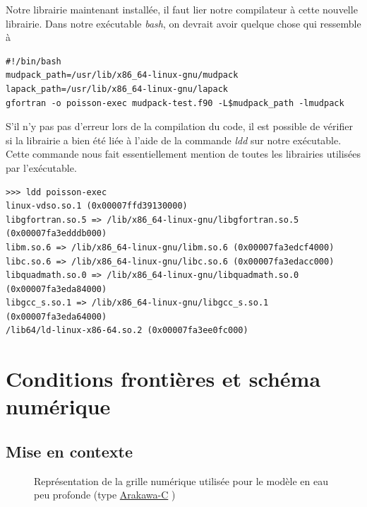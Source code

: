 \documentclass[10pt]{article}
\numberwithin{equation}{section}
\newcommand{\pt}{\hspace{1pt}}
\begin{document}
Notre librairie maintenant installée, il faut lier notre compilateur à cette nouvelle librairie.
Dans notre exécutable \emph{bash}, on devrait avoir quelque chose qui ressemble à
\begin{verbatim}
#!/bin/bash
mudpack_path=/usr/lib/x86_64-linux-gnu/mudpack
lapack_path=/usr/lib/x86_64-linux-gnu/lapack
gfortran -o poisson-exec mudpack-test.f90 -L$mudpack_path -lmudpack
\end{verbatim}
S'il n'y pas pas d'erreur lors de la compilation du code, il est possible de vérifier si la librairie a bien été liée à l'aide de la commande \emph{ldd} sur notre exécutable.
Cette commande nous fait essentiellement mention de toutes les librairies utilisées par l'exécutable.
\begin{verbatim}
>>> ldd poisson-exec
linux-vdso.so.1 (0x00007ffd39130000)
libgfortran.so.5 => /lib/x86_64-linux-gnu/libgfortran.so.5 (0x00007fa3edddb000)
libm.so.6 => /lib/x86_64-linux-gnu/libm.so.6 (0x00007fa3edcf4000)
libc.so.6 => /lib/x86_64-linux-gnu/libc.so.6 (0x00007fa3edacc000)
libquadmath.so.0 => /lib/x86_64-linux-gnu/libquadmath.so.0 (0x00007fa3eda84000)
libgcc_s.so.1 => /lib/x86_64-linux-gnu/libgcc_s.so.1 (0x00007fa3eda64000)
/lib64/ld-linux-x86-64.so.2 (0x00007fa3ee0fc000)
\end{verbatim}

\section{Conditions frontières et schéma numérique}
\label{sec:orgd4e6304}
\subsection{Mise en contexte}
\label{sec:orgb686fec}
\begin{figure}
\vspace{-\baselineskip}
\centering
{}
\caption{\label{org71a1a08}Représentation de la grille numérique utilisée pour le modèle en eau peu profonde (type \href{https://en.wikipedia.org/wiki/Arakawa\_grids}{Arakawa-C} )}
\end{figure}
\end{document}
